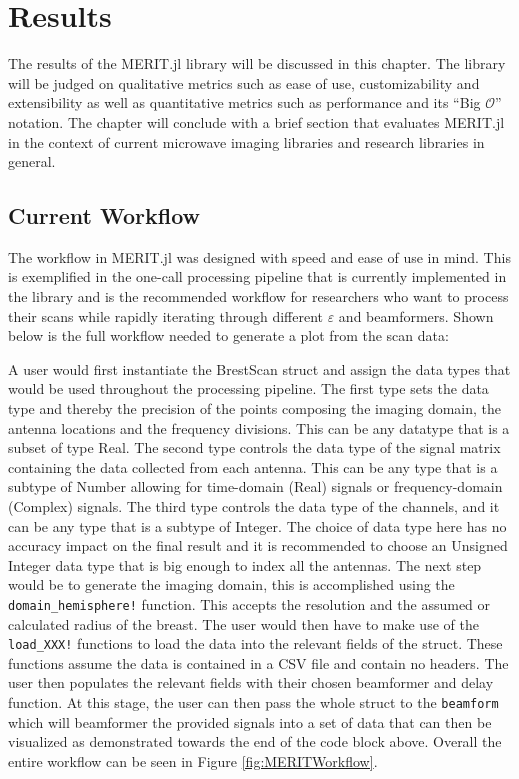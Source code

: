 \setcounter{chapter}{4}
\setcounter{section}{0}
\setcounter{subsection}{0}
\chapter*{Results}
The results of the MERIT.jl library will be discussed in this chapter. The library will be judged on qualitative metrics
such as ease of use, customizability and extensibility as well as quantitative metrics such as performance and its ``Big
$\mathcal{O}$'' notation. The chapter will conclude with a brief section that evaluates MERIT.jl in the context of
current microwave imaging libraries and research libraries in general.

\section{Current Workflow}
\label{CurrentWorkflow}
The workflow in MERIT.jl was designed with speed and ease of use in mind. This is exemplified in the one-call processing
pipeline that is currently implemented in the library and is the recommended workflow for researchers who want to
process their scans while rapidly iterating through different $\varepsilon$ and beamformers. Shown below is the full
workflow needed to generate a plot from the scan data:

A user would first instantiate the BrestScan struct and assign the data types that would be used throughout the
processing pipeline. The first type sets the data type and thereby the precision of the points composing the imaging
domain, the antenna locations and the frequency divisions. This can be any datatype that is a subset of type Real. The
second type controls the data type of the signal matrix containing the data collected from each antenna. This can be any
type that is a subtype of Number allowing for time-domain (Real) signals or frequency-domain (Complex) signals. The
third type controls the data type of the channels, and it can be any type that is a subtype of Integer. The choice of
data type here has no accuracy impact on the final result and it is recommended to choose an Unsigned Integer data type
that is big enough to index all the antennas. The next step would be to generate the imaging domain, this is
accomplished using the \lstinline[language=Julia]{domain_hemisphere!} function. This accepts the resolution and the
assumed or calculated radius of the breast. The user would then have to make use of the
\lstinline[language=Julia]{load_XXX!} functions to load the data into the relevant fields of the struct. These functions
assume the data is contained in a CSV file and contain no headers. The user then populates the relevant fields with
their chosen beamformer and delay function. At this stage, the user can then pass the whole struct to the
\lstinline[language=Julia]{beamform} which will beamformer the provided signals into a set of data that can then be
visualized as demonstrated towards the end of the code block above. Overall the entire workflow can be seen in Figure
\ref{fig:MERITWorkflow}.

